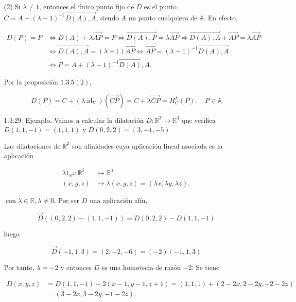\documentclass[12pt, a4paper, ones, notitlepage, openany,titlepage]{article}
\begin{document}
(2) Si $\lambda \neq 1$, entonces el único punto fijo de $D$ es el punto $C=A+(\lambda-1)^{-1} \overrightarrow{D(A), A}$, siendo $A$ un punto cualquiera de $\mathbb{A}$. En efecto,

$$
\begin{aligned}
D(P)=P & \Longleftrightarrow D(A)+\lambda \overrightarrow{A P}=P \Longleftrightarrow \overrightarrow{D(A), P}=\lambda \overrightarrow{A P} \Longleftrightarrow \overrightarrow{D(A), A}+\overrightarrow{A P}=\lambda \overrightarrow{A P} \\
& \Longleftrightarrow \overrightarrow{D(A), A}=(\lambda-1) \overrightarrow{A P} \Longleftrightarrow \overrightarrow{A P}=(\lambda-1)^{-1} \overrightarrow{D(A), A} \\
& \Longleftrightarrow P=A+(\lambda-1)^{-1} \overrightarrow{D(A), A} .
\end{aligned}
$$

Por la proposición $1.3 .5(2)$,

$$
D(P)=C+\left(\lambda \operatorname{id}_{V}\right)(\overrightarrow{C P})=C+\lambda \overrightarrow{C P}=H_{C}^{\lambda}(P), \quad P \in \mathbb{A}
$$

1.3.29. Ejemplo. Vamos a calcular la dilatación $D: \mathbb{R}^{3} \rightarrow \mathbb{R}^{3}$ que verifica $D(1,1,-1)=(1,1,1)$ y $D(0,2,2)=(3,-1,-5)$

Las dilataciones de $\mathbb{R}^{3}$ son afinidades cuya aplicación lineal asociada es la aplicación

$$
\begin{aligned}
\lambda 1_{\mathbb{R}^{3}}: \mathbb{R}^{3} & \longrightarrow \mathbb{R}^{3} \\
(x, y, z) & \longmapsto \lambda(x, y, z)=(\lambda x, \lambda y, \lambda z),
\end{aligned}
$$

$\operatorname{con} \lambda \in \mathbb{R}, \lambda \neq 0$. Por ser $D$ una aplicación afín,

$$
\vec{D}((0,2,2)-(1,1,-1))=D(0,2,2)-D(1,1,-1)
$$

luego

$$
\vec{D}(-1,1,3)=(2,-2,-6)=(-2)(-1,1,3)
$$

Por tanto, $\lambda=-2$ y entonces $D$ es una homotecia de razón $-2$. Se tiene

$$
\begin{aligned}
D(x, y, z) & =D(1,1,-1)-2(x-1, y-1, z+1)=(1,1,1)+(2-2 x, 2-2 y,-2-2 z) \\
& =(3-2 x, 3-2 y,-1-2 z) .
\end{aligned}
$$
\end{document}
